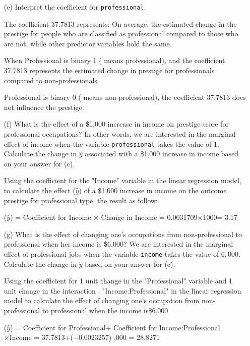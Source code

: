 \documentclass[12pt,letterpaper]{article}
\begin{document}
\begin{enumerate}
	\vspace{2cm}	
	\item [(e)]
	Interpret the coefficient for \texttt{professional}.

 The coefficient 37.7813 represents: On average,   the estimated change in the prestige for people who are classified as professional compared to those who are not, while other predictor variables hold the same.
 
 When Professional is binary 1 ( means professional), and the coefficient 37.7813 represents the estimated change in prestige for professionals compared to non-professionals.

 Professional is binary 0 ( means non-professional),  the coefficient  37.7813 does not influence the prestige. 

	\newpage
	\item [(f)]
	What is the effect of a \$1,000 increase in income on prestige score for professional occupations? In other words, we are interested in the marginal effect of income when the variable \texttt{professional} takes the value of $1$. Calculate the change in $\hat{y}$ associated with a \$1,000 increase in income based on your answer for (c).
 
	 Using  the coefficient for the "Income" variable in the linear regression model, to  calculate the effect ($\hat{y}$) of a \$1,000 increase in income on the outcome prestige  for professional type, the result as follow: 

  
($\hat{y}$) = Coefficient for Income × Change in Income = 0.0031709×1000= 3.17
  
	\vspace{2cm}
	
	
	\item [(g)]
	What is the effect of changing one's occupations from non-professional to professional when her income is \$6,000? We are interested in the marginal effect of professional jobs when the variable \texttt{income} takes the value of $6,000$. Calculate the change in $\hat{y}$ based on your answer for (c).

 Using the coefficient for  1 unit change in the "Professional" variable and  1 unit change in the interaction : "Income:Professional" in the linear regression model to calculate the effect of changing one's occupation from non-professional to professional when the income is\$6,000

 ($\hat{y}$) = Coefficient for Professional+ Coefficient for Income:Professional 
 ×Income =  37.7813+(−0.0023257) ,000 = 28.8271
	
\end{enumerate}
\end{document}
